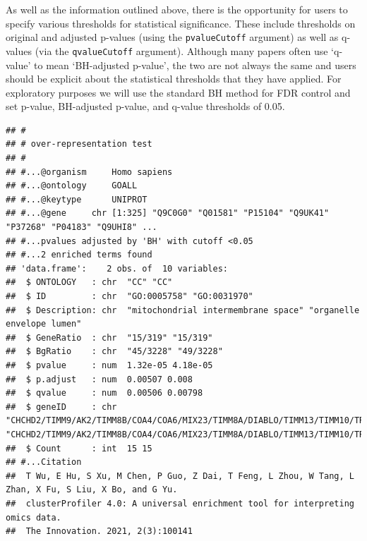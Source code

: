 \documentclass[9pt,a4paper,]{extarticle}
\newenvironment{Shaded}{\begin{snugshade}}{\end{snugshade}}
\newcommand{\AttributeTok}[1]{\textcolor[rgb]{0.77,0.63,0.00}{#1}}
\newcommand{\ConstantTok}[1]{\textcolor[rgb]{0.00,0.00,0.00}{#1}}
\newcommand{\DocumentationTok}[1]{\textcolor[rgb]{0.56,0.35,0.01}{\textbf{\textit{#1}}}}
\newcommand{\FloatTok}[1]{\textcolor[rgb]{0.00,0.00,0.81}{#1}}
\newcommand{\FunctionTok}[1]{\textcolor[rgb]{0.00,0.00,0.00}{#1}}
\newcommand{\NormalTok}[1]{#1}
\newcommand{\OtherTok}[1]{\textcolor[rgb]{0.56,0.35,0.01}{#1}}
\newcommand{\SpecialCharTok}[1]{\textcolor[rgb]{0.00,0.00,0.00}{#1}}
\newcommand{\StringTok}[1]{\textcolor[rgb]{0.31,0.60,0.02}{#1}}
\begin{document}
As well as the information outlined above, there is the opportunity for users to
specify various thresholds for statistical significance. These include
thresholds on original and adjusted p-values (using the \texttt{pvalueCutoff} argument)
as well as q-values (via the \texttt{qvalueCutoff} argument). Although many papers
often use `q- value' to mean `BH-adjusted p-value', the two are not always the
same and users should be explicit about the statistical thresholds that they
have applied. For exploratory purposes we will use the standard BH method for
FDR control and set p-value, BH-adjusted p-value, and q-value thresholds of
0.05.

\begin{Shaded}
\end{Shaded}

\begin{verbatim}
## #
## # over-representation test
## #
## #...@organism     Homo sapiens 
## #...@ontology     GOALL 
## #...@keytype      UNIPROT 
## #...@gene     chr [1:325] "Q9C0G0" "Q01581" "P15104" "Q9UK41" "P37268" "P04183" "Q9UHI8" ...
## #...pvalues adjusted by 'BH' with cutoff <0.05 
## #...2 enriched terms found
## 'data.frame':    2 obs. of  10 variables:
##  $ ONTOLOGY   : chr  "CC" "CC"
##  $ ID         : chr  "GO:0005758" "GO:0031970"
##  $ Description: chr  "mitochondrial intermembrane space" "organelle envelope lumen"
##  $ GeneRatio  : chr  "15/319" "15/319"
##  $ BgRatio    : chr  "45/3228" "49/3228"
##  $ pvalue     : num  1.32e-05 4.18e-05
##  $ p.adjust   : num  0.00507 0.008
##  $ qvalue     : num  0.00506 0.00798
##  $ geneID     : chr  "CHCHD2/TIMM9/AK2/TIMM8B/COA4/COA6/MIX23/TIMM8A/DIABLO/TIMM13/TIMM10/TRIAP1/CYCS/COX17/CAT" "CHCHD2/TIMM9/AK2/TIMM8B/COA4/COA6/MIX23/TIMM8A/DIABLO/TIMM13/TIMM10/TRIAP1/CYCS/COX17/CAT"
##  $ Count      : int  15 15
## #...Citation
##  T Wu, E Hu, S Xu, M Chen, P Guo, Z Dai, T Feng, L Zhou, W Tang, L Zhan, X Fu, S Liu, X Bo, and G Yu.
##  clusterProfiler 4.0: A universal enrichment tool for interpreting omics data.
##  The Innovation. 2021, 2(3):100141
\end{verbatim}
\end{document}

